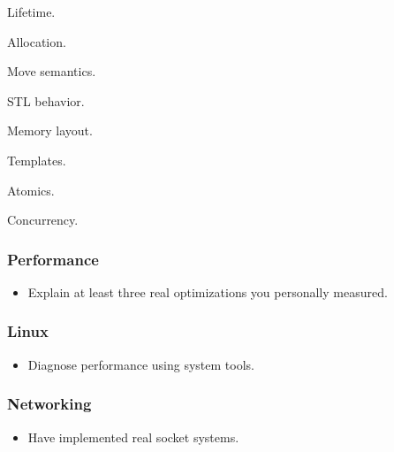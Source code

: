 \documentclass[11pt,letterpaper]{article}
\begin{document}
\begin{topics}

\item Lifetime.

\item Allocation.

\item Move semantics.

\item STL behavior.

\item Memory layout.

\item Templates.

\item Atomics.

\item Concurrency.

\end{topics}

\subsubsection*{Performance}

\begin{itemize}

\item Explain at least three real optimizations you personally measured.

\end{itemize}

\subsubsection*{Linux}

\begin{itemize}

\item Diagnose performance using system tools.

\end{itemize}

\subsubsection*{Networking}

\begin{itemize}

\item Have implemented real socket systems.

\end{itemize}
\end{document}
